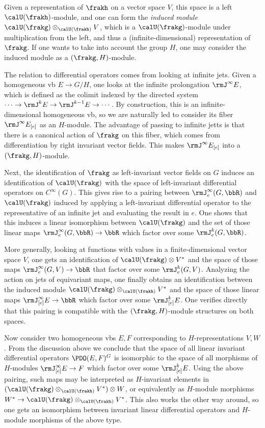 Given a representation of $\frakh$ on a vector space $V$, this space is a left $\calU(\frakh)$-module, and one can form the \emph{induced module} $\calU(\frakg)\otimes_{\calU(\frakh)}V$, which is a $\calU(\frakg)$-module under multiplication from the left, and thus a (infinite-dimensional) representation of $\frakg$. If one wants to take into account the group $H$, one may consider the induced module as a $(\frakg,H)$-module.

The relation to differential operators comes from looking at infinite jets. Given a homogeneous \gls{vb} $E\to G\slash H$, one looks at the infinite prolongation $\rmJ^\infty E$, which is defined as the colimit indexed by the directed system $\cdots\to \rmJ^k E\to \rmJ^{k-1}E\to \cdots$. By construction, this is an infinite-dimensional homogeneous \gls{vb}, so we are naturally led to consider its fiber $\rmJ^\infty E_{[e]}$ as an $H$-module. The advantage of passing to infinite jetts is that there is a canonical action of $\frakg$ on this fiber, which comes from differentiation by right invariant vector fields. This makes $\rmJ^\infty E_{[e]}$ into a $(\frakg,H)$-module.

Next, the identification of $\frakg$ as left-invariant vector fields on $G$ induces an identification of $\calU(\frakg)$ with the space of left-invariant differential operators on $C^\infty(G)$. This gives rise to a pairing between $\rmJ^\infty_e(G,\bbR)$ and $\calU(\frakg)$ induced by applying a left-invariant differential operator to the representative of an infinite jet and evaluating the result in $e$. One shows that this induces a linear isomorphism between $\calU(\frakg)$ and the set of those linear maps $\rmJ^\infty_e(G,\bbR)\to \bbR$ which factor over some $\rmJ^k_e(G,\bbR)$.

More generally, looking at functions with values in a finite-dimensional vector space $V$, one gets an identification of $\calU(\frakg)\otimes V^\ast$ and the space of those maps $\rmJ^\infty_e(G,V)\to \bbR$ that factor over some $\rmJ^k_e(G,V)$. Analyzing the action on jets of equivariant maps, one finally obtains an identification between the induced module $\calU(\frakg)\otimes_{\calU(\frakh)}V^\ast$ and the space of those linear maps $\rmJ^\infty_{[e]}E\to \bbR$ which factor over some $\rmJ^k_{[e]}E$. One verifies directly that this pairing is compatible with the $(\frakg,H)$-module structures on both spaces.

Now consider two homogeneous \glspl{vb} $E,F$ corresponding to $H$-representations $V,W$. From the discussion above we conclude that the space of all linear invariant differential operators $\PDO(E,F)^G$ is isomorphic to the space of all morphisms of $H$-modules $\rmJ^\infty_{[e]}E\to F$ which factor over some $\rmJ^k_{[e]}E$. Using the above pairing, such maps may be interpreted as $H$-invariant elements in $(\calU(\frakg)\otimes_{\calU(\frakh)}V^\ast)\otimes W$, or equivalently as $H$-module morphisms $W^\ast\to \calU(\frakg)\otimes_{\calU(\frakh)}V^\ast$. This also works the other way around, so one gets an isomorphism between invariant linear differential operators and $H$-module morphisms of the above type. 
 

